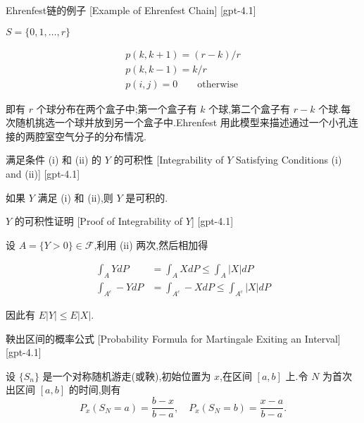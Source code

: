 \documentclass[UTF8]{ctexart}
\begin{document}
    
    
    \begin{xmp}
        {Ehrenfest链的例子}
        [Example of Ehrenfest Chain]
        [gpt-4.1]
        
$S = \{ 0 , 1 , \ldots , r \}$

\[
\begin{array} { l } 
{ p ( k , k + 1 ) = ( r - k ) / r } \\ 
{ p ( k , k - 1 ) = k / r } \\ 
{ p ( i , j ) = 0 \qquad \mathrm{otherwise} } 
\end{array}
\]

即有 $r$ 个球分布在两个盒子中;第一个盒子有 $k$ 个球,第二个盒子有 $r-k$ 个球.每次随机挑选一个球并放到另一个盒子中.Ehrenfest 用此模型来描述通过一个小孔连接的两腔室空气分子的分布情况.

    \end{xmp}
    
    
    
    \begin{lma}
        {满足条件 (i) 和 (ii) 的 $Y$ 的可积性}
        [Integrability of $Y$ Satisfying Conditions (i) and (ii)]
        [gpt-4.1]
        
如果 $Y$ 满足 (i) 和 (ii),则 $Y$ 是可积的.

    \end{lma}
    
    
    
    \begin{prf}
        {$Y$ 的可积性证明}
        [Proof of Integrability of $Y$]
        [gpt-4.1]
        
设 $A = \{ Y > 0 \} \in \mathcal{F}$,利用 (ii) 两次,然后相加得

\[
\begin{aligned}
\int_A Y dP &= \int_A X dP \le \int_A |X| dP \\
\int_{A^c} -Y dP &= \int_{A^c} -X dP \le \int_{A^c} |X| dP
\end{aligned}
\]

因此有 $E|Y| \leq E|X|$.

    \end{prf}
    
    
    
    \begin{thm}
        {鞅出区间的概率公式}
        [Probability Formula for Martingale Exiting an Interval]
        [gpt-4.1]
        
设 $\{S_n\}$ 是一个对称随机游走(或鞅),初始位置为 $x$,在区间 $[a, b]$ 上.令 $N$ 为首次出区间 $[a, b]$ 的时间,则有
\[
P_x(S_N = a) = \frac{b - x}{b - a}, \quad P_x(S_N = b) = \frac{x - a}{b - a}.
\]

    \end{thm}
    
\end{document}
